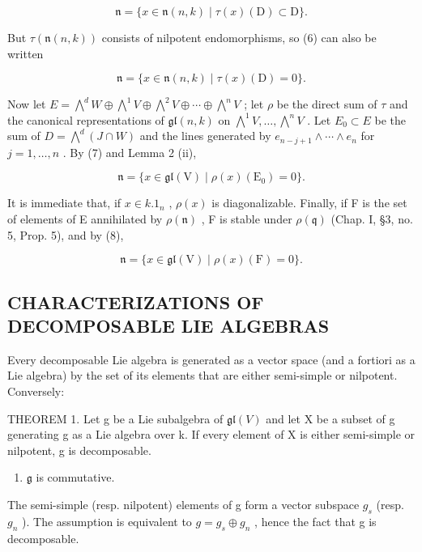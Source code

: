 \[
\mathfrak {n} = \{x \in \mathfrak {n} (n, k) \mid \tau (x) (\mathrm{D}) \subset \mathrm{D} \}.\tag{6}
\]

But \(\tau (\mathfrak{n}(n,k))\) consists of nilpotent endomorphisms, so (6) can also be written

\[
\mathfrak {n} = \{x \in \mathfrak {n} (n, k) \mid \tau (x) (\mathrm{D}) = 0 \}.\tag{7}
\]

Now let \(E = \bigwedge^{d} W \oplus \bigwedge^{1} V \oplus \bigwedge^{2} V \oplus \cdots \oplus \bigwedge^{n} V\) ; let \(\rho\) be the direct sum of \(\tau\) and the canonical representations of \(\mathfrak{gl}(n, k)\) on \(\bigwedge^{1} V, \ldots, \bigwedge^{n} V\) . Let \(E_{0} \subset E\) be the sum of \(D = \bigwedge^{d} (J \cap W)\) and the lines generated by \(e_{n-j+1} \wedge \cdots \wedge e_{n}\) for \(j = 1, \ldots, n\) . By (7) and Lemma 2 (ii),

\[
\mathfrak {n} = \{x \in \mathfrak {g l} (\mathrm{V}) \mid \rho (x) (\mathrm{E} _ {0}) = 0 \}.\tag{8}
\]

It is immediate that, if \(x \in k.1_{n}\) , \(\rho(x)\) is diagonalizable. Finally, if F is the set of elements of E annihilated by \(\rho(\mathfrak{n})\) , F is stable under \(\rho(\mathfrak{q})\) (Chap. I, §3, no. 5, Prop. 5), and by (8),

\[
\mathfrak {n} = \{x \in \mathfrak {g l} (\mathrm{V}) \mid \rho (x) (\mathrm{F}) = 0 \}.\tag{9}
\]

\subsection{CHARACTERIZATIONS OF DECOMPOSABLE LIE ALGEBRAS}

Every decomposable Lie algebra is generated as a vector space (and a fortiori as a Lie algebra) by the set of its elements that are either semi-simple or nilpotent. Conversely:

THEOREM 1. Let g be a Lie subalgebra of \(\mathfrak{gl}(V)\) and let X be a subset of g generating g as a Lie algebra over k. If every element of X is either semi-simple or nilpotent, g is decomposable.

\begin{enumerate}
\def\labelenumi{\alph{enumi})}
\tightlist
\item
  \(\mathfrak{g}\) is commutative.
\end{enumerate}

The semi-simple (resp. nilpotent) elements of g form a vector subspace \(g_{s}\) (resp. \(g_{n}\) ). The assumption is equivalent to \(g = g_{s} \oplus g_{n}\) , hence the fact that g is decomposable.

